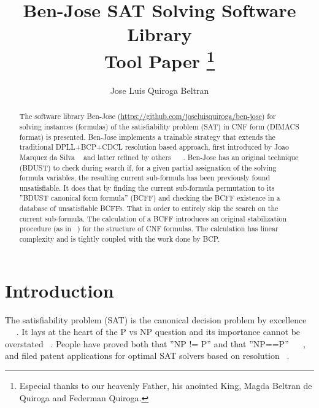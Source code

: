 \documentclass{easychair}
\title{Ben-Jose SAT Solving Software Library\\
       Tool Paper%
\thanks{Especial thanks to our heavenly Father, his anointed King, Magda Beltran de Quiroga and Federman Quiroga.}}
\author{
Jose Luis Quiroga Beltran
}
\institute{
	Independent Researcher\\
	\email{joseluisquiroga@yahoo.com}\\
	March 2016
 }
\begin{document}
\maketitle

\begin{abstract}
The software library Ben-Jose (\url{https://github.com/joseluisquiroga/ben-jose}) for solving instances (formulas) of the satisfiability problem (SAT) in CNF form (DIMACS format) is presented. Ben-Jose implements a trainable strategy that extends the traditional DPLL+BCP+CDCL resolution based approach, first introduced by Joao Marquez da Silva ~\cite{silva-95} and latter refined by others ~\cite{moskewicz-01} ~\cite{een-04}. Ben-Jose has an original technique (BDUST) to check during search if, for a given partial assignation of the solving formula variables, the resulting current sub-formula has been previously found unsatisfiable. It does that by finding the current sub-formula permutation to its ''BDUST canonical form formula'' (BCFF) and checking the BCFF existence in a database of unsatisfiable BCFFs. That in order to entirely skip the search on the current sub-formula. The calculation of a BCFF introduces an original stabilization procedure (as in ~\cite{bastert-02}) for the structure of CNF formulas. The calculation has linear complexity and is tightly coupled with the work done by BCP.
\end{abstract}


\setcounter{tocdepth}{2}
{\small
\tableofcontents}

%
%

\pagestyle{empty}

\section{Introduction}
\label{sect:introduction}

The satisfiability problem (SAT) is the canonical decision problem by excellence ~\cite{biere-09} ~\cite{kroening-08} ~\cite{marek-09}. It lays at the heart of the P vs NP question and its importance cannot be overstated ~\cite{cook-09}. People have proved both that ''NP != P'' and that ''NP==P'' ~\cite{woeginger-16} ~\cite{muller-13}, and filed patent applications for optimal SAT solvers based on resolution ~\cite{quiroga-01}. 
\end{document}
